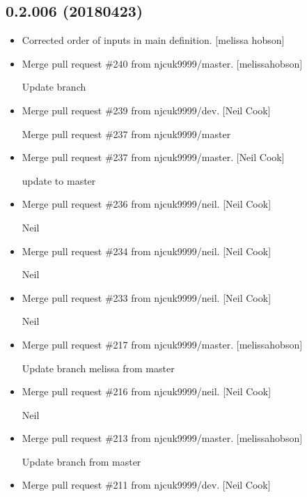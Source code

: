 \documentclass[a4paper,10pt,english]{report}
\begin{document}
\subsection{0.2.006 (2018\sphinxhyphen{}04\sphinxhyphen{}23)}
\label{\detokenize{misc/changelog:id475}}\begin{itemize}
\item {} 
Corrected order of inputs in  main definition. {[}melissa\sphinxhyphen{}
hobson{]}

\item {} 
Merge pull request \#240 from njcuk9999/master. {[}melissa\sphinxhyphen{}hobson{]}

Update branch

\item {} 
Merge pull request \#239 from njcuk9999/dev. {[}Neil Cook{]}

Merge pull request \#237 from njcuk9999/master

\item {} 
Merge pull request \#237 from njcuk9999/master. {[}Neil Cook{]}

update to master

\item {} 
Merge pull request \#236 from njcuk9999/neil. {[}Neil Cook{]}

Neil

\item {} 
Merge pull request \#234 from njcuk9999/neil. {[}Neil Cook{]}

Neil

\item {} 
Merge pull request \#233 from njcuk9999/neil. {[}Neil Cook{]}

Neil

\item {} 
Merge pull request \#217 from njcuk9999/master. {[}melissa\sphinxhyphen{}hobson{]}

Update branch melissa from master

\item {} 
Merge pull request \#216 from njcuk9999/neil. {[}Neil Cook{]}

Neil

\item {} 
Merge pull request \#213 from njcuk9999/master. {[}melissa\sphinxhyphen{}hobson{]}

Update branch from master

\item {} 
Merge pull request \#211 from njcuk9999/dev. {[}Neil Cook{]}


\end{itemize}
\end{document}
